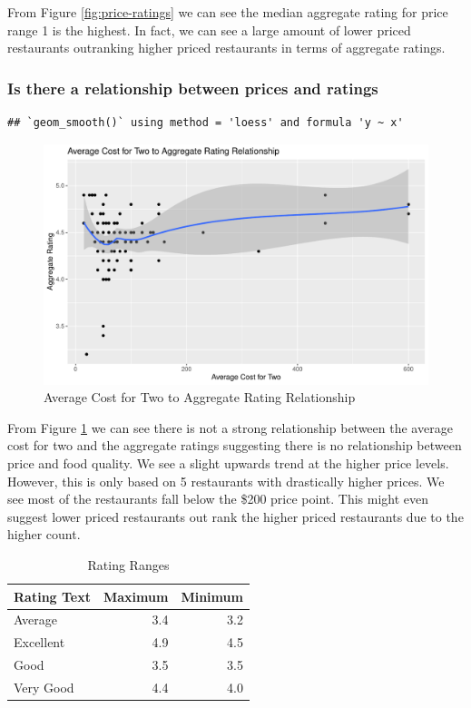 \documentclass[11pt,a4paper,]{article}
\begin{document}
From Figure \ref{fig:price-ratings} we can see the median aggregate rating for price range 1 is the highest. In fact, we can see a large amount of lower priced restaurants outranking higher priced restaurants in terms of aggregate ratings.

\hypertarget{is-there-a-relationship-between-prices-and-ratings}{%
\subsubsection{Is there a relationship between prices and ratings}\label{is-there-a-relationship-between-prices-and-ratings}}

\begin{verbatim}
## `geom_smooth()` using method = 'loess' and formula 'y ~ x'
\end{verbatim}

\begin{figure}
\centering
\includegraphics{assignment4_files/figure-latex/cost-rating-relationship-1.pdf}
\caption{\label{fig:cost-rating-relationship}Average Cost for Two to Aggregate Rating Relationship}
\end{figure}

From Figure \ref{fig:cost-rating-relationship} we can see there is not a strong relationship between the average cost for two and the aggregate ratings suggesting there is no relationship between price and food quality. We see a slight upwards trend at the higher price levels. However, this is only based on 5 restaurants with drastically higher prices. We see most of the restaurants fall below the \$200 price point. This might even suggest lower priced restaurants out rank the higher priced restaurants due to the higher count.

\begin{table}[!h]

\caption{\label{tab:rating-ranges}Rating Ranges}
\centering
\begin{tabular}[t]{l|r|r}
\hline
Rating Text & Maximum & Minimum\\
\hline
Average & 3.4 & 3.2\\
\hline
Excellent & 4.9 & 4.5\\
\hline
Good & 3.5 & 3.5\\
\hline
Very Good & 4.4 & 4.0\\
\hline
\end{tabular}
\end{table}
\end{document}
